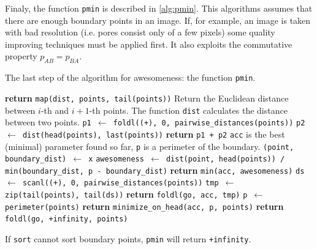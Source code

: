 \documentclass[reprint,amsmath,amssymb,aps,pre,showkeys,showpacs]{revtex4-1}
\begin{document}
Finaly, the function \texttt{pmin} is described in \cref{alg:pmin}. This
algorithms assumes that there are enough boundary points in an image. If, for
example, an image is taken with bad resolution (i.e. pores consist only of a few
pixels) some quality improving techniques must be applied first. It also
exploits the commutative property $p_{AB} = p_{BA}$.
\begin{algorithm}[H]
  \caption{The last step of the algorithm for awesomeness: the function \texttt{pmin}.}
  \label{alg:pmin}
  \begin{algorithmic}[1]
    \State \textbf{return} \texttt{map(dist, points, tail(points))}
    \Comment Return the Euclidean distance between $i$-th and $i+1$-th
    points. The function \texttt{dist} calculates the distance between two
    points.
    \EndProcedure
    \State \texttt{p1 $\gets$ foldl((+), 0, pairwise\_distances(points))}
    \State \texttt{p2 $\gets$ dist(head(points), last(points))}
    \State \textbf{return} \texttt{p1 + p2}
    \EndProcedure
    \Comment \texttt{acc} is the best (minimal) parameter found so far,
    \texttt{p} is a perimeter of the boundary.
    \State \texttt{(point, boundary\_dist) $\gets$ x}
    \State \texttt{awesomeness $\gets$ dist(point, head(points)) /
      min(boundary\_dist, p - boundary\_dist)}
    \State \textbf{return} \texttt{min(acc, awesomeness)}
    \EndProcedure
    \State \texttt{ds $\gets$ scanl((+), 0, pairwise\_distances(points))}
    \State \texttt{tmp $\gets$ zip(tail(points), tail(ds))}
    \State \textbf{return} \texttt{foldl(go, acc, tmp)}
    \EndProcedure
    \State \texttt{p $\gets$ perimeter(points)}
    \State \textbf{return} \texttt{minimize\_on\_head(acc, p, points)}
    \EndProcedure
    \State \textbf{return} \texttt{foldl(go, +infinity, points)}
    \EndProcedure
  \end{algorithmic}
\end{algorithm}
If \texttt{sort} cannot sort boundary points, \texttt{pmin} will return
\texttt{+infinity}.
\end{document}
